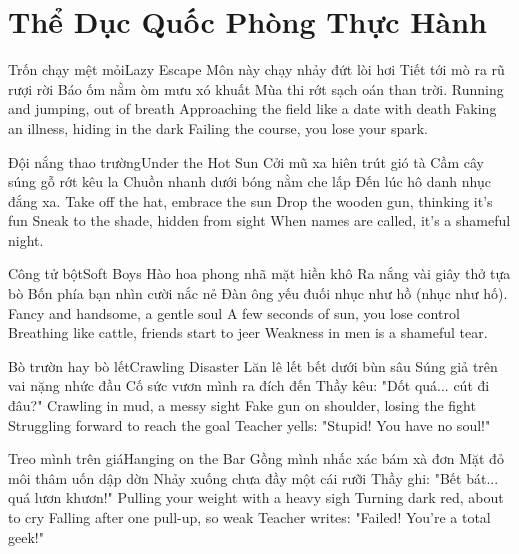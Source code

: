 \chapter{Thể Dục Quốc Phòng Thực Hành}

\begin{tutuyetbox}{Trốn chạy mệt mỏi}{Lazy Escape}
Môn này chạy nhảy đứt lòi hơi
Tiết tới mò ra rũ rượi rời
Báo ốm nằm òm mưu xó khuất
Mùa thi rớt sạch oán than trời.
\tcblower
Running and jumping, out of breath 
Approaching the field like a date with death 
Faking an illness, hiding in the dark 
Failing the course, you lose your spark.
\end{tutuyetbox}

\begin{tutuyetbox}{Đội nắng thao trường}{Under the Hot Sun}
Cởi mũ xa hiên trút gió tà
Cầm cây súng gỗ rớt kêu la
Chuồn nhanh dưới bóng nằm che lấp
Đến lúc hô danh nhục đắng xa.
\tcblower
Take off the hat, embrace the sun 
Drop the wooden gun, thinking it's fun 
Sneak to the shade, hidden from sight 
When names are called, it's a shameful night.
\end{tutuyetbox}

\begin{tutuyetbox}{Công tử bột}{Soft Boys}
Hào hoa phong nhã mặt hiền khô
Ra nắng vài giây thở tựa bò
Bốn phía bạn nhìn cười nắc nẻ
Đàn ông yếu đuối nhục như hồ (nhục như hố).
\tcblower
Fancy and handsome, a gentle soul 
A few seconds of sun, you lose control 
Breathing like cattle, friends start to jeer 
Weakness in men is a shameful tear.
\end{tutuyetbox}

\begin{tutuyetbox}{Bò trườn hay bò lết}{Crawling Disaster}
Lăn lê lết bết dưới bùn sâu
Súng giả trên vai nặng nhức đầu
Cố sức vươn mình ra đích đến
Thầy kêu: "Dốt quá... cút đi đâu?"
\tcblower
Crawling in mud, a messy sight 
Fake gun on shoulder, losing the fight 
Struggling forward to reach the goal 
Teacher yells: "Stupid! You have no soul!"
\end{tutuyetbox}

\begin{tutuyetbox}{Treo mình trên giá}{Hanging on the Bar}
Gồng mình nhấc xác bám xà đơn
Mặt đỏ môi thâm uốn dập dờn
Nhảy xuống chưa đầy một cái rưỡi
Thầy ghi: "Bết bát... quá lươn khươn!"
\tcblower
Pulling your weight with a heavy sigh 
Turning dark red, about to cry 
Falling after one pull-up, so weak 
Teacher writes: "Failed! You're a total geek!"
\end{tutuyetbox}

